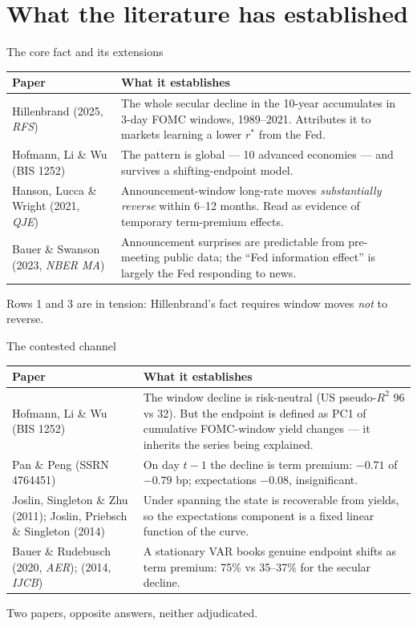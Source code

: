 \documentclass[11pt,aspectratio=169]{beamer}
\newcommand{\tk}[1]{{\color{ink2}\footnotesize #1}}
\newcommand{\rs}{$r^{*}$}
\begin{document}
\section{What the literature has established}

\begin{frame}{The core fact and its extensions}
\footnotesize
\begin{tabular}{@{}p{}p{}@{}}
\toprule
\textbf{Paper} & \textbf{What it establishes}\\ \midrule
Hillenbrand (2025, \emph{RFS}) & The whole secular decline in the 10-year accumulates in 3-day FOMC windows, 1989--2021. Attributes it to markets learning a lower \rs{} from the Fed.\\[0.35em]
Hofmann, Li \& Wu (BIS 1252) & The pattern is global --- 10 advanced economies --- and survives a shifting-endpoint model.\\[0.35em]
Hanson, Lucca \& Wright (2021, \emph{QJE}) & Announcement-window long-rate moves \emph{substantially reverse} within 6--12 months. Read as evidence of temporary term-premium effects.\\[0.35em]
Bauer \& Swanson (2023, \emph{NBER MA}) & Announcement surprises are predictable from pre-meeting public data; the ``Fed information effect'' is largely the Fed responding to news.\\
\bottomrule
\end{tabular}
\vspace{0.4em}

\tk{Rows 1 and 3 are in tension: Hillenbrand's fact requires window moves \emph{not} to reverse.}
\end{frame}

\begin{frame}{The contested channel}
\footnotesize
\begin{tabular}{@{}p{}p{}@{}}
\toprule
\textbf{Paper} & \textbf{What it establishes}\\ \midrule
Hofmann, Li \& Wu (BIS 1252) & The window decline is \alert{risk-neutral} (US pseudo-$R^2$ 96 vs 32). \tk{But the endpoint is defined as PC1 of cumulative FOMC-window yield changes --- it inherits the series being explained.}\\[0.35em]
Pan \& Peng (SSRN 4764451) & On day $t-1$ the decline is \alert{term premium}: $-0.71$ of $-0.79$ bp; expectations $-0.08$, insignificant.\\[0.35em]
Joslin, Singleton \& Zhu (2011); Joslin, Priebsch \& Singleton (2014) & Under spanning the state is recoverable from yields, so the expectations component is a fixed linear function of the curve.\\[0.35em]
Bauer \& Rudebusch (2020, \emph{AER}); (2014, \emph{IJCB}) & A stationary VAR books genuine endpoint shifts as term premium: 75\% vs 35--37\% for the secular decline.\\
\bottomrule
\end{tabular}
\vspace{0.4em}

\tk{Two papers, opposite answers, neither adjudicated.}
\end{frame}
\end{document}
